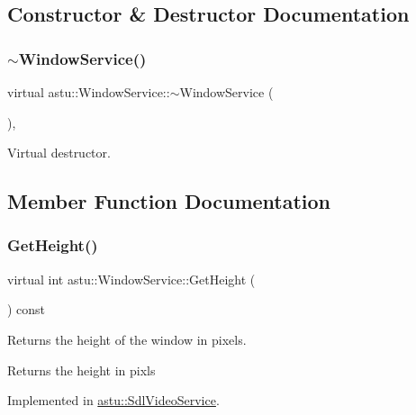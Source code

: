 \subsection{Constructor \& Destructor Documentation}
\mbox{\label{classastu_1_1WindowService_afa84180c2149454f5062608b468e7b51}} 
\subsubsection{\texorpdfstring{$\sim$\+Window\+Service()}{~WindowService()}}
{\footnotesize\ttfamily virtual astu\+::\+Window\+Service\+::$\sim$\+Window\+Service (\begin{DoxyParamCaption}{ }\end{DoxyParamCaption})\hspace{0.3cm}{\ttfamily [inline]}, {\ttfamily [virtual]}}

Virtual destructor. 

\subsection{Member Function Documentation}
\mbox{\label{classastu_1_1WindowService_a16d1880606a2c597162d8c80bed9d1a2}} 
\subsubsection{\texorpdfstring{Get\+Height()}{GetHeight()}}
{\footnotesize\ttfamily virtual int astu\+::\+Window\+Service\+::\+Get\+Height (\begin{DoxyParamCaption}{ }\end{DoxyParamCaption}) const\hspace{0.3cm}{\ttfamily [pure virtual]}}

Returns the height of the window in pixels.

\begin{DoxyReturn}{Returns}
the height in pixls 
\end{DoxyReturn}


Implemented in \hyperlink{classastu_1_1SdlVideoService_a76d0f56254c9545d4d9762349133d4af}{astu\+::\+Sdl\+Video\+Service}.

